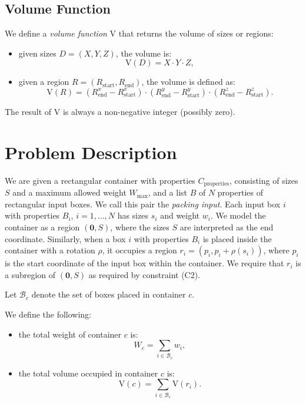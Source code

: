 \subsection*{Volume Function}

We define a \emph{volume function} $\mathrm{V}$ that returns the volume of sizes or regions:

\begin{itemize}
    \item given sizes $D = (X, Y, Z)$, the volume is:
    \[
    \mathrm{V}(D) = X \cdot Y \cdot Z,
    \]
    
    \item given a region $R = (R_\text{start}, R_\text{end})$, the volume is defined as:
    \[
    \mathrm{V}(R) = (R_\text{end}^x - R_\text{start}^x) \cdot (R_\text{end}^y - R_\text{start}^y) \cdot (R_\text{end}^z - R_\text{start}^z).
    \]
\end{itemize}

The result of $\mathrm{V}$ is always a non-negative integer (possibly zero).













\section{Problem Description}

We are given a rectangular container with properties $C_\text{properties}$, consisting of sizes $S$ and a maximum allowed weight $W_\text{max}$, 
and a list $B$ of $N$ properties of rectangular input boxes. We call this pair the \emph{packing input}. 
Each input box $i$ with properties $B_i$, $i = 1, \dots, N$ has sizes $s_i$ and weight $w_i$.
We model the container as a region $(\mathbf{0}, S)$, 
where the sizes $S$ are interpreted as the end coordinate.
Similarly, when a box $i$ with properties $B_i$ is placed inside the container with a rotation $\rho$, 
it occupies a region $r_i = (p_i, p_i + \rho(s_i))$, where $p_i$ is the start coordinate of the input box within the container. 
We require that $r_i$ is a subregion of $(\mathbf{0}, S)$ as required by constraint (C2).

Let $\mathcal{B}_c$ denote the set of boxes placed in container $c$. 


We define the following:


\begin{itemize}
    \item the total weight of container $c$ is:
    \[
    W_c = \sum_{i \in \mathcal{B}_c} w_i,
    \]
    
    \item the total volume occupied in container $c$ is:
    \[
    \mathrm{V}(c) = \sum_{i \in \mathcal{B}_c} \mathrm{V}(r_i).
    \]
\end{itemize}

